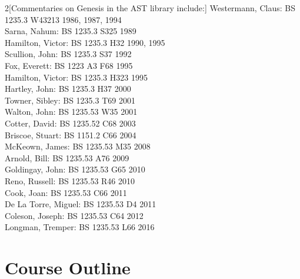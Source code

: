 \documentclass[titlepage]{article}
\begin{document}
\begin{multicols}{2}[Commentaries on Genesis in the AST library include:]
Westermann, Claus: {\scshape BS 1235.3 W43213 1986, 1987, 1994}\\
Sarna, Nahum: {\scshape BS 1235.3 S325 1989}\\
Hamilton, Victor: {\scshape BS 1235.3 H32 1990, 1995}\\
Scullion, John: {\scshape BS 1235.3 S37 1992}\\
Fox, Everett: {\scshape BS 1223 A3 F68 1995}\\
Hamilton, Victor: {\scshape BS 1235.3 H323 1995}\\
Hartley, John: {\scshape BS 1235.3 H37 2000}\\
Towner, Sibley: {\scshape BS 1235.3 T69 2001}\\
Walton, John: {\scshape BS 1235.53 W35 2001}\\
Cotter, David: {\scshape BS 1235.52 C68 2003}\\
Briscoe, Stuart: {\scshape BS 1151.2 C66 2004}\\
McKeown, James: {\scshape BS 1235.53 M35 2008}\\
Arnold, Bill: {\scshape BS 1235.53 A76 2009}\\
Goldingay, John: {\scshape BS 1235.53 G65 2010}\\
Reno, Russell: {\scshape BS 1235.53 R46 2010}\\
Cook, Joan: {\scshape BS 1235.53 C66 2011}\\
De La Torre, Miguel: {\scshape BS 1235.53 D4 2011}\\
Coleson, Joseph: {\scshape BS 1235.53 C64 2012}\\
Longman, Tremper: {\scshape BS 1235.53 L66 2016}
\end{multicols}

\section{Course Outline}
\label{outline}
\end{document}
